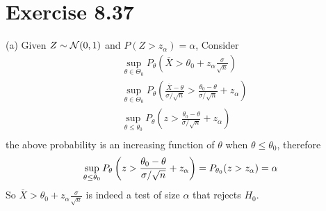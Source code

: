 \documentclass[12pt]{article}
\begin{document}
\section*{Exercise 8.37}
(a) 
Given $Z \sim \mathcal{N}(0, 1)$ and $P(Z > z_\alpha) = \alpha$,  Consider \begin{align*}
	&\sup_{\theta \in \Theta_0} P_{\theta}\left( \overline{X} > \theta_0 + z_{\alpha}\frac{\sigma}{ \sqrt{n}} \right) \\
	&\sup_{\theta \in \Theta_0} P_{\theta}\left( \frac{\overline{X} - \theta}{\sigma / \sqrt{n}} > \frac{\theta_0 - \theta}{\sigma / \sqrt{n}} + z_{\alpha} \right) \\
	&\sup_{\theta \leq \theta_0} P_{\theta}\left( z > \frac{\theta_0 - \theta}{\sigma / \sqrt{n}} + z_{\alpha} \right) \\
\end{align*}
the above probability is an increasing function of $\theta$ when $\theta \leq \theta_0$, therefore
$$
 \sup_{\theta \leq \theta_0} P_{\theta}\left( z > \frac{\theta_0 - \theta}{\sigma / \sqrt{n}} + z_{\alpha} \right) = P_{\theta_0}(z > z_\alpha) = \alpha \\
$$
So $ \overline{X} > \theta_0 + z_{\alpha}\frac{\sigma}{ \sqrt{n}} $ is indeed a test of size $\alpha$ that rejects $H_0$.  \QED
\end{document}

